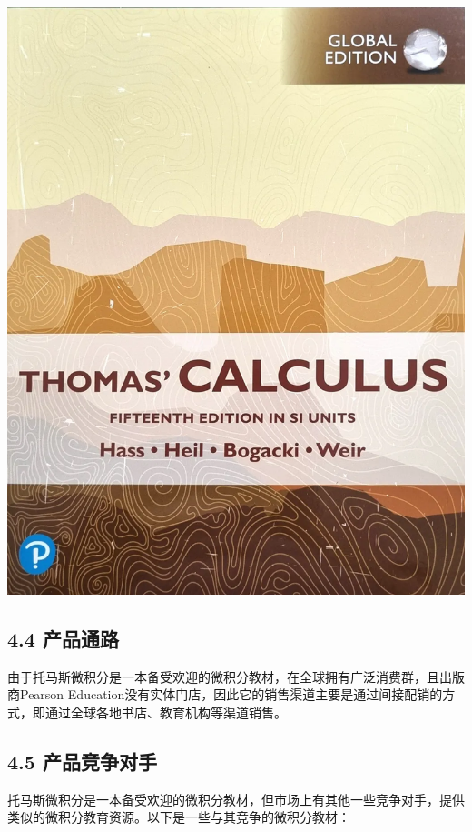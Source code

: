 \documentclass{report}
\begin{document}
\begin{center}
    \includegraphics[scale=0.3]{./cover.png}
\end{center}

\subsection*{4.4 产品通路}

由于托马斯微积分是一本备受欢迎的微积分教材，在全球拥有广泛消费群，且出版商Pearson Education没有实体门店，因此它的销售渠道主要是通过间接配销的方式，即通过全球各地书店、教育机构等渠道销售。

\subsection*{4.5 产品竞争对手}

托马斯微积分是一本备受欢迎的微积分教材，但市场上有其他一些竞争对手，提供类似的微积分教育资源。以下是一些与其竞争的微积分教材：
\end{document}
